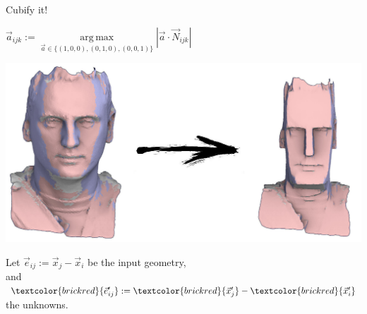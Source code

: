 \documentclass[UKenglish,aspectratio=169]{beamer}
\DeclareMathOperator*{\argmax}{arg\,max}
\newcommand\unknown[1]{\textcolor{brickred}{#1}}
\begin{document}
\begin{frame}{Cubify it!}
\begin{minipage}[t]{.4\linewidth}
\strut\vspace*{-\baselineskip}\newline
$\vec{a}_{ijk} := \argmax\limits_{\vec{a}\in \{(1,0,0), (0,1,0), (0,0,1)\}} \left|\vec{a} \cdot \vec{N}_{ijk}\right|$

\includegraphics[width=\linewidth]{../manuscript/img/cubify-flagging.jpg}
\pause
{}
\end{minipage}
\quad
\begin{minipage}[t]{.5\linewidth}
\strut\vspace*{-\baselineskip}\newline
Let $\vec{e}_{ij}:=\vec{x}_j - \vec{x}_i$ be the input geometry, \\ and $\unknown{\vec{e}_{ij}'}:=\unknown{\vec{x}_j'} - \unknown{\vec{x}_i'}$ the unknowns.


\end{minipage}
\end{frame}
\end{document}
